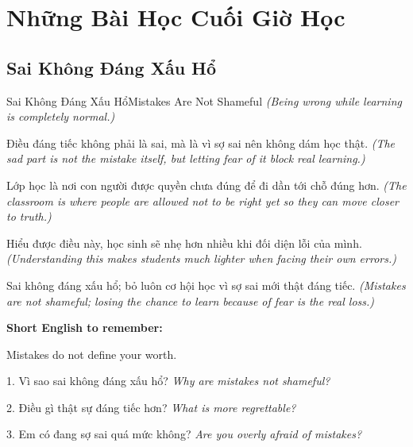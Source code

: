 \chapter{Những Bài Học Cuối Giờ Học}

\section{Sai Không Đáng Xấu Hổ}
\begin{truyen}{Sai Không Đáng Xấu Hổ}{Mistakes Are Not Shameful}
\textit{(Being wrong while learning is completely normal.)}

Điều đáng tiếc không phải là sai, mà là vì sợ sai nên không dám học thật.
\textit{(The sad part is not the mistake itself, but letting fear of it block real learning.)}

Lớp học là nơi con người được quyền chưa đúng để đi dần tới chỗ đúng hơn.
\textit{(The classroom is where people are allowed not to be right yet so they can move closer to truth.)}

Hiểu được điều này, học sinh sẽ nhẹ hơn nhiều khi đối diện lỗi của mình.
\textit{(Understanding this makes students much lighter when facing their own errors.)}
\end{truyen}

\begin{baihoc}
Sai không đáng xấu hổ; bỏ luôn cơ hội học vì sợ sai mới thật đáng tiếc.
\textit{(Mistakes are not shameful; losing the chance to learn because of fear is the real loss.)}
\end{baihoc}

\begin{ghinhoanh}
\textbf{Short English to remember:}

Mistakes do not define your worth.

\end{ghinhoanh}

\begin{tuhocnhanh}
1. Vì sao sai không đáng xấu hổ? \textit{Why are mistakes not shameful?}

2. Điều gì thật sự đáng tiếc hơn? \textit{What is more regrettable?}

3. Em có đang sợ sai quá mức không? \textit{Are you overly afraid of mistakes?}
\end{tuhocnhanh}
\ngancach

